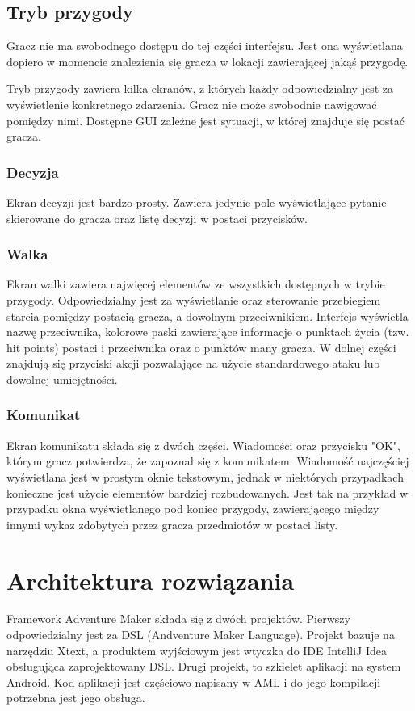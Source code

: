 \documentclass{xmgr}
\begin{document}
\section{Tryb przygody}
Gracz nie ma swobodnego dostępu do tej części interfejsu. Jest ona wyświetlana dopiero w momencie znalezienia się gracza w lokacji zawierającej jakąś przygodę.

Tryb przygody zawiera kilka ekranów, z których każdy odpowiedzialny jest za wyświetlenie konkretnego zdarzenia. Gracz nie może swobodnie nawigować pomiędzy nimi. Dostępne GUI zależne jest sytuacji, w której znajduje się postać gracza.
\subsection*{Decyzja}
Ekran decyzji jest bardzo prosty. Zawiera jedynie pole wyświetlające pytanie skierowane do gracza oraz listę decyzji w postaci przycisków.
\subsection*{Walka}
Ekran walki zawiera najwięcej elementów ze wszystkich dostępnych w trybie przygody. Odpowiedzialny jest za wyświetlanie oraz sterowanie przebiegiem starcia pomiędzy postacią gracza, a dowolnym przeciwnikiem. Interfejs wyświetla nazwę przeciwnika, kolorowe paski zawierające informacje o punktach życia (tzw. hit points) postaci i przeciwnika oraz o punktów many gracza. W dolnej części znajdują się przyciski akcji pozwalające na użycie standardowego ataku lub dowolnej umiejętności.
\subsection*{Komunikat}
Ekran komunikatu składa się z dwóch części. Wiadomości oraz przycisku "OK", którym gracz potwierdza, że zapoznał się z komunikatem. Wiadomość najczęściej wyświetlana jest w prostym oknie tekstowym, jednak w niektórych przypadkach konieczne jest użycie elementów bardziej rozbudowanych. Jest tak na przykład w przypadku okna wyświetlanego pod koniec przygody, zawierającego między innymi wykaz zdobytych przez gracza przedmiotów w postaci listy.

\chapter{Architektura rozwiązania}

Framework Adventure Maker składa się z dwóch projektów. Pierwszy odpowiedzialny jest za DSL (Andventure Maker Language). Projekt bazuje na narzędziu Xtext, a produktem wyjściowym jest wtyczka do IDE IntelliJ Idea obsługująca zaprojektowany DSL. Drugi projekt, to szkielet aplikacji na system Android. Kod aplikacji jest częściowo napisany w AML i do jego kompilacji potrzebna jest jego obsługa.
\end{document}
